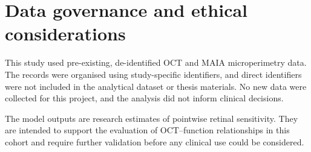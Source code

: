 \section{Data governance and ethical considerations}
\label{sec:ethics}

This study used pre-existing, de-identified OCT and MAIA microperimetry data. The records were organised using study-specific identifiers, and direct identifiers were not included in the analytical dataset or thesis materials. No new data were collected for this project, and the analysis did not inform clinical decisions.

The model outputs are research estimates of pointwise retinal sensitivity. They are intended to support the evaluation of OCT--function relationships in this cohort and require further validation before any clinical use could be considered.

